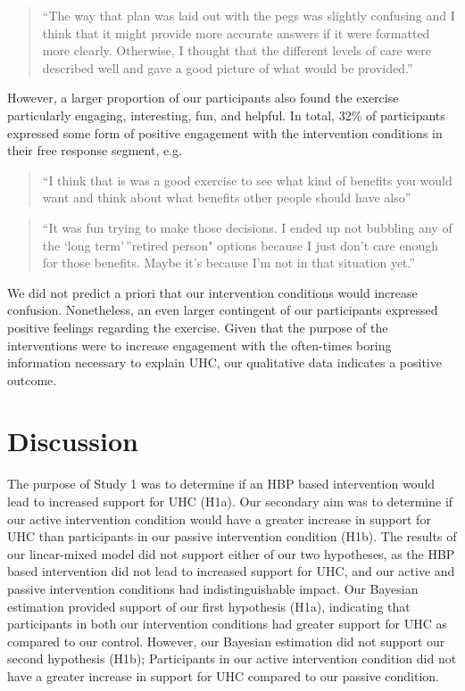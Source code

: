 \documentclass[
  english,
  man]{apa6}
\begin{document}
\begin{quote}
``The way that plan was laid out with the pegs was slightly confusing and I think that it might provide more accurate answers if it were formatted more clearly. Otherwise, I thought that the different levels of care were described well and gave a good picture of what would be provided.''
\end{quote}

However, a larger proportion of our participants also found the exercise particularly engaging, interesting, fun, and helpful. In total, 32\% of participants expressed some form of positive engagement with the intervention conditions in their free response segment, e.g.

\begin{quote}
``I think that is was a good exercise to see what kind of benefits you would want and think about what benefits other people should have also''
\end{quote}

\begin{quote}
``It was fun trying to make those decisions. I ended up not bubbling any of the `long term'\,''retired person" options because I just don't care enough for those benefits. Maybe it's because I'm not in that situation yet.''
\end{quote}

We did not predict a priori that our intervention conditions would increase confusion. Nonetheless, an even larger contingent of our participants expressed positive feelings regarding the exercise. Given that the purpose of the interventions were to increase engagement with the often-times boring information necessary to explain UHC, our qualitative data indicates a positive outcome.

\hypertarget{discussion}{%
\section{Discussion}\label{discussion}}

The purpose of Study 1 was to determine if an HBP based intervention would lead to increased support for UHC (H1a). Our secondary aim was to determine if our active intervention condition would have a greater increase in support for UHC than participants in our passive intervention condition (H1b). The results of our linear-mixed model did not support either of our two hypotheses, as the HBP based intervention did not lead to increased support for UHC, and our active and passive intervention conditions had indistinguishable impact. Our Bayesian estimation provided support of our first hypothesis (H1a), indicating that participants in both our intervention conditions had greater support for UHC as compared to our control. However, our Bayesian estimation did not support our second hypothesis (H1b); Participants in our active intervention condition did not have a greater increase in support for UHC compared to our passive condition.
\end{document}
